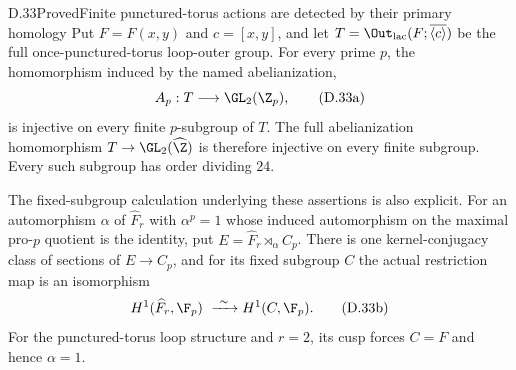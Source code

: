 \begin{claim}{D.33}{Proved}{Finite punctured-torus actions are detected by their primary homology}
Put $F=\widehat F(x,y)$ and $c=[x,y]$, and let
$T=\Out_{\rm lac}(F;\overline{\langle c\rangle})$ be the full
once-punctured-torus loop-outer group.  For every prime $p$, the
homomorphism induced by the named abelianization,
\[
              A_p:T\longrightarrow\GL_2(\Z_p),            \tag{D.33a}
\]
is injective on every finite $p$-subgroup of $T$.
The full abelianization homomorphism
$T\to\GL_2(\widehat\Z)$ is therefore injective on every finite
subgroup.  Every such subgroup has order dividing $24$.

The fixed-subgroup calculation underlying these assertions is also
explicit.  For an automorphism $\alpha$ of $\widehat F_r$ with
$\alpha^p=1$ whose induced automorphism on the maximal pro-$p$
quotient is the identity, put $E=\widehat F_r\rtimes_\alpha C_p$.
There is one kernel-conjugacy class of sections of $E\to C_p$,
and for its fixed subgroup $C$ the actual restriction map is an
isomorphism
\[
 H^1(\widehat F_r,\F_p)\ \xrightarrow{\ \sim\ }H^1(C,\F_p).
                                                        \tag{D.33b}
\]
For the punctured-torus loop structure and $r=2$, its cusp forces
$C=F$ and hence $\alpha=1$.
\end{claim}
